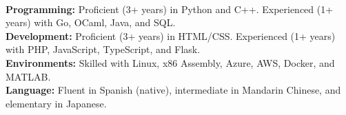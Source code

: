 \documentclass[11pt]{article}
\begin{document}
   \vspace{-7pt}\\
   \noindent\makebox[\linewidth]{\rule{7.5in}{0.3pt}}
   \textbf{Programming:} Proficient (3+ years) in Python and C++. Experienced (1+ years) with Go, OCaml, Java, and SQL.\\
   \textbf{Development:} Proficient (3+ years) in HTML/CSS. Experienced (1+ years) with PHP, JavaScript, TypeScript, and Flask.\\
   \textbf{Environments:} Skilled with Linux, x86 Assembly, Azure, AWS, Docker, and MATLAB.\\
   \textbf{Language:} 
     Fluent in Spanish (native), intermediate in Mandarin Chinese, and elementary in Japanese.\\
\end{document}
